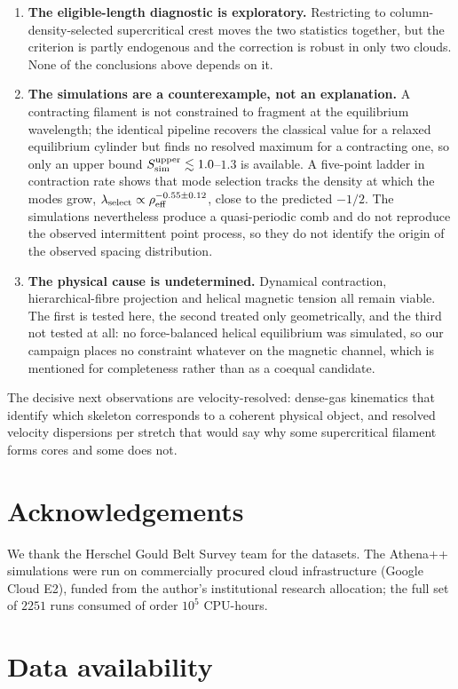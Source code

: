 \documentclass[usenatbib,twoside,twocolumn]{mnras}
\begin{document}
\begin{enumerate}
\item \textbf{The eligible-length diagnostic is exploratory.} Restricting to column-density-selected supercritical crest moves the two statistics together, but the criterion is partly endogenous and the correction is robust in only two clouds. None of the conclusions above depends on it.
\item \textbf{The simulations are a counterexample, not an explanation.} A contracting filament is not constrained to fragment at the equilibrium wavelength; the identical pipeline recovers the classical value for a relaxed equilibrium cylinder but finds no resolved maximum for a contracting one, so only an upper bound $S_{\rm sim}^{\rm upper}\lesssim1.0$--$1.3$ is available. A five-point ladder in contraction rate shows that mode selection tracks the density at which the modes grow, $\lambda_{\rm select}\propto\rho_{\rm eff}^{-0.55\pm0.12}$, close to the predicted $-1/2$. The simulations nevertheless produce a quasi-periodic comb and do not reproduce the observed intermittent point process, so they do not identify the origin of the observed spacing distribution.
\item \textbf{The physical cause is undetermined.} Dynamical contraction, hierarchical-fibre projection and helical magnetic tension all remain viable. The first is tested here, the second treated only geometrically, and the third not tested at all: no force-balanced helical equilibrium was simulated, so our campaign places no constraint whatever on the magnetic channel, which is mentioned for completeness rather than as a coequal candidate.
\end{enumerate}

The decisive next observations are velocity-resolved: dense-gas kinematics that identify which skeleton corresponds to a coherent physical object, and resolved velocity dispersions per stretch that would say why some supercritical filament forms cores and some does not.

\section*{Acknowledgements}

We thank the Herschel Gould Belt Survey team for the datasets. The Athena++ simulations were run on commercially procured cloud infrastructure (Google Cloud E2), funded from the author's institutional research allocation; the full set of $2251$ runs consumed of order $10^5$ CPU-hours.

\section*{Data availability}
\end{document}
